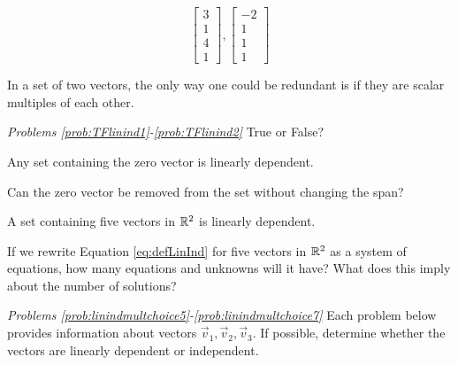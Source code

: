 \documentclass{ximera}
\begin{document}
\begin{problem}\label{prob:linindmultchoice4}
$$\begin{bmatrix}3\\1\\4\\1\end{bmatrix}, \begin{bmatrix}-2\\1\\1\\1\end{bmatrix}$$

\begin{multipleChoice}
 \end{multipleChoice}
 \begin{hint}
 In a set of two vectors, the only way one could be redundant is if they are scalar multiples of each other.
 \end{hint}

\end{problem}


\emph{Problems \ref{prob:TFlinind1}-\ref{prob:TFlinind2}}
True or False?

\begin{problem}\label{prob:TFlinind1}
Any set containing the zero vector is linearly dependent.
\begin{multipleChoice}
 \end{multipleChoice}
  \begin{hint}
 Can the zero vector be removed from the set without changing the span?
 \end{hint}
 \end{problem}
 
\begin{problem}\label{prob:TFlinind2}
A set containing five vectors in $\mathbb{R}^2$ is linearly dependent.
\begin{multipleChoice}
 \end{multipleChoice}
  \begin{hint}
 If we rewrite Equation \ref{eq:defLinInd} for five vectors in $\mathbb{R}^2$ as a system of equations, how many equations and unknowns will it have?  What does this imply about the number of solutions?
 \end{hint}
\end{problem}


\emph{Problems \ref{prob:linindmultchoice5}-\ref{prob:linindmultchoice7}}
Each problem below provides information about vectors $\vec{v}_1, \vec{v}_2, \vec{v}_3$.  If possible, determine whether the vectors are linearly dependent or independent.
\end{document}
